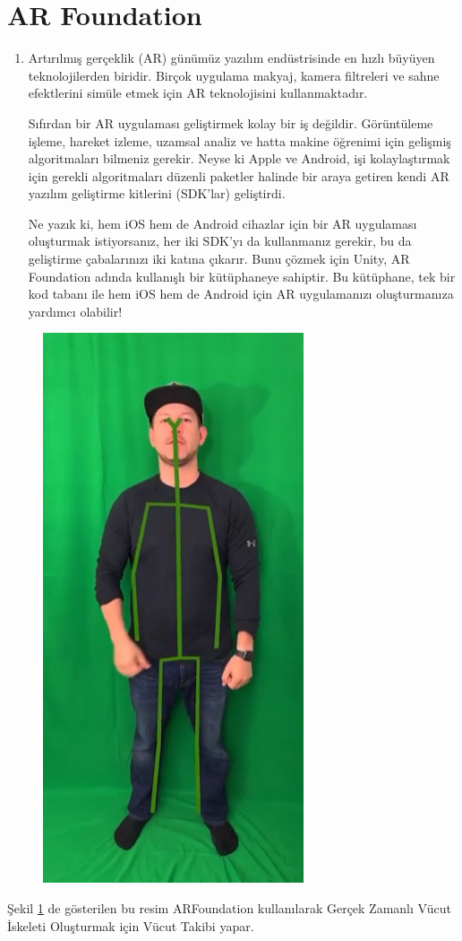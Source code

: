 \documentclass[12pt, a4paper]{article}
\begin{document}
	\section{AR Foundation }
	\begin{enumerate}
		\item Artırılmış gerçeklik (AR) günümüz yazılım endüstrisinde en hızlı büyüyen teknolojilerden biridir. Birçok uygulama makyaj, kamera filtreleri ve sahne efektlerini simüle etmek için AR teknolojisini kullanmaktadır.
		
		Sıfırdan bir AR uygulaması geliştirmek kolay bir iş değildir. Görüntüleme işleme, hareket izleme, uzamsal analiz ve hatta makine öğrenimi için gelişmiş algoritmaları bilmeniz gerekir. Neyse ki Apple ve Android, işi kolaylaştırmak için gerekli algoritmaları düzenli paketler halinde bir araya getiren kendi AR yazılım geliştirme kitlerini (SDK'lar) geliştirdi.
		
		Ne yazık ki, hem iOS hem de Android cihazlar için bir AR uygulaması oluşturmak istiyorsanız, her iki SDK'yı da kullanmanız gerekir, bu da geliştirme çabalarınızı iki katına çıkarır. Bunu çözmek için Unity, AR Foundation adında kullanışlı bir kütüphaneye sahiptir. Bu kütüphane, tek bir kod tabanı ile hem iOS hem de Android için AR uygulamanızı oluşturmanıza yardımcı olabilir!\cite{ARFoundation}
		
	\end{enumerate}
	\newpage
	\begin{figure}[!ht]
		\caption{}
		\centering
		\includegraphics[height=0.8\textheight]{ARFoundation.PNG}
		
		\label{ARFoundation}
	\end{figure}
	Şekil \ref{ARFoundation} de gösterilen bu resim ARFoundation kullanılarak Gerçek Zamanlı Vücut İskeleti Oluşturmak için Vücut Takibi yapar.\cite{Youtube}
	
\end{document}
